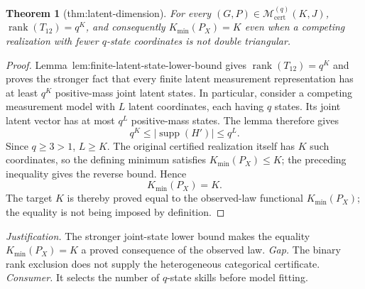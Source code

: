 \documentclass{article}
\newtheorem{theorem}{Theorem}
\begin{document}
\begin{theorem}[thm:latent-dimension]\label{thm:latent-dimension}
For every \((G,P)\in\mathcal M_{\mathrm{cert}}^{(q)}(K,J)\), \(\operatorname{rank}(T_{12})=q^K\), and consequently \(K_{\min}(P_X)=K\) even when a competing realization with fewer \(q\)-state coordinates is not double triangular.
\end{theorem}
\begin{proof}
Lemma~\textnormal{lem:finite-latent-state-lower-bound} gives \(\operatorname{rank}(T_{12})=q^K\) and proves the stronger fact that every finite latent measurement representation has at least \(q^K\) positive-mass joint latent states.  In particular, consider a competing measurement model with \(L\) latent coordinates, each having \(q\) states.  Its joint latent vector has at most \(q^L\) positive-mass states.  The lemma therefore gives
\[
 q^K\le |\operatorname{supp}(H')|\le q^L.
\]
Since \(q\ge3>1\), \(L\ge K\).  The original certified realization itself has \(K\) such coordinates, so the defining minimum satisfies \(K_{\min}(P_X)\le K\); the preceding inequality gives the reverse bound.  Hence
\[
 K_{\min}(P_X)=K.
\]
The target \(K\) is thereby proved equal to the observed-law functional \(K_{\min}(P_X)\); the equality is not being imposed by definition.
\end{proof}
\par\smallskip\noindent \textit{Justification.} The stronger joint-state lower bound makes the equality \(K_{\min}(P_X)=K\) a proved consequence of the observed law. \textit{Gap.} The binary rank exclusion does not supply the heterogeneous categorical certificate. \textit{Consumer.} It selects the number of \(q\)-state skills before model fitting.
\end{document}
